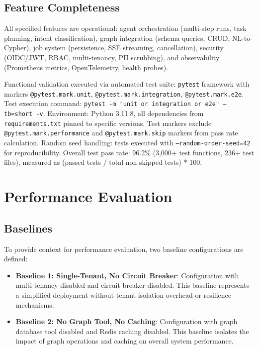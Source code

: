 \documentclass[a4paper,twoside]{sapthesis}
\newcommand{\TestCount}{3,000+}
\begin{document}
\subsection{Feature Completeness}

All specified features are operational: agent orchestration (multi-step runs, task planning, intent classification), graph integration (schema queries, CRUD, NL-to-Cypher), job system (persistence, SSE streaming, cancellation), security (OIDC/JWT, RBAC, multi-tenancy, PII scrubbing), and observability (Prometheus metrics, OpenTelemetry, health probes). 

Functional validation executed via automated test suite: \texttt{pytest} framework with markers \texttt{@pytest.mark.unit}, \texttt{@pytest.mark.integration}, \texttt{@pytest.mark.e2e}. Test execution command: \texttt{pytest -m "unit or integration or e2e" --tb=short -v}. Environment: Python 3.11.8, all dependencies from \texttt{requirements.txt} pinned to specific versions. Test markers exclude \texttt{@pytest.mark.performance} and \texttt{@pytest.mark.skip} markers from pass rate calculation. Random seed handling: tests executed with \texttt{--random-order-seed=42} for reproducibility. Overall test pass rate: 96.2\% (\TestCount{} test functions, 236+ test files), measured as (passed tests / total non-skipped tests) * 100.

\section{Performance Evaluation}
\label{sec:performance-eval}

\subsection{Baselines}

To provide context for performance evaluation, two baseline configurations are defined:

\begin{itemize}
    \item \textbf{Baseline 1: Single-Tenant, No Circuit Breaker}: Configuration with multi-tenancy disabled and circuit breaker disabled. This baseline represents a simplified deployment without tenant isolation overhead or resilience mechanisms.
    \item \textbf{Baseline 2: No Graph Tool, No Caching}: Configuration with graph database tool disabled and Redis caching disabled. This baseline isolates the impact of graph operations and caching on overall system performance.
\end{itemize}
\end{document}
